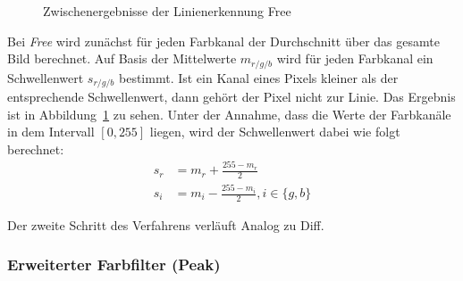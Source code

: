 \documentclass[ngerman,a4paper,parskip=half]{scrartcl}
\begin{document}
\begin{figure}
	\caption{Zwischenergebnisse der Linienerkennung Free}
	\label{fig:free}
\end{figure}

Bei \emph{Free} wird zunächst für jeden Farbkanal der Durchschnitt über das gesamte Bild berechnet.
Auf Basis der Mittelwerte $m_{r/g/b}$ wird für jeden Farbkanal ein Schwellenwert $s_{r/g/b}$ bestimmt. Ist ein Kanal eines Pixels kleiner als der entsprechende Schwellenwert, dann gehört der Pixel nicht zur Linie. Das Ergebnis ist in Abbildung~\ref{fig:free} zu sehen.
Unter der Annahme, dass die Werte der Farbkanäle in dem Intervall $[0,255]$ liegen, wird der Schwellenwert dabei wie folgt berechnet:
\begin{align*}
	s_r &= m_r + \frac{255 - m_r}{2}\\
	s_i &= m_i - \frac{255 - m_i}{2}, i \in \{g,b\}
\end{align*}

Der zweite Schritt des Verfahrens verläuft Analog zu Diff.

\subsubsection{Erweiterter Farbfilter (Peak)}
\end{document}
